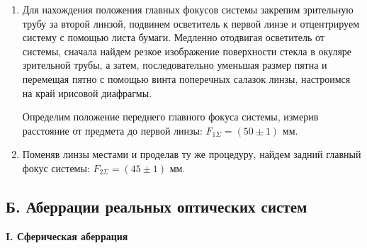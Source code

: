 \documentclass[12pt,a4paper]{article}
\begin{document}
\begin{enumerate}
		\item Для нахождения положения главных фокусов системы закрепим зрительную трубу за второй линзой, подвинем осветитель к первой линзе и отцентрируем систему с помощью листа бумаги. Медленно отодвигая осветитель от системы, сначала найдем резкое изображение поверхности стекла в окуляре зрительной трубы, а затем, последовательно уменьшая размер пятна и перемещая пятно с помощью винта поперечных салазок линзы, настроимся на край ирисовой диафрагмы.
		
		Определим положение переднего главного фокуса системы, измерив расстояние от предмета до первой линзы: $F_{1\Sigma} = (50 \pm 1)$ мм.
		
		\item Поменяв линзы местами и проделав ту же процедуру, найдем задний главный фокус системы: $F_{2\Sigma} = (45 \pm 1)$ мм.
	\end{enumerate}

	\subsection*{Б. Аберрации реальных оптических систем}
	
	\begin{center}
		\textbf{I. Сферическая аберрация}
	\end{center}
\end{document}

